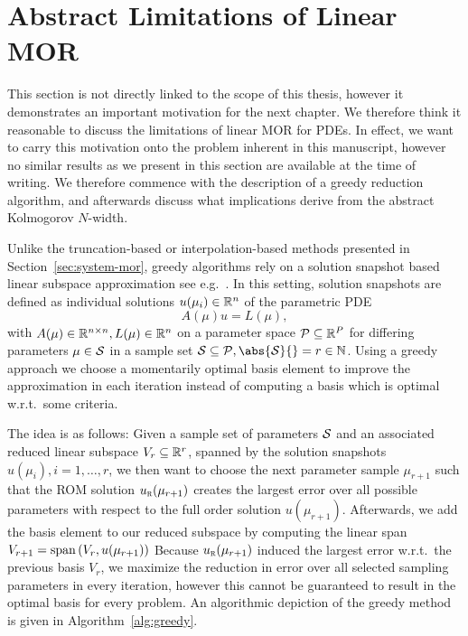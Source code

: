 \section{Abstract Limitations of Linear MOR}\label{sec:limitations-linear-mor}

This section is not directly linked to the scope of this thesis, however it demonstrates an important motivation for the next chapter.
We therefore think it reasonable to discuss the limitations of linear MOR for \acp{PDE}.
In effect, we want to carry this motivation onto the problem inherent in this manuscript, however no similar results as we present in this section are available at the time of writing.
We therefore commence with the description of a greedy reduction algorithm, and afterwards discuss what implications derive from the abstract Kolmogorov $N$-width.

Unlike the truncation-based or interpolation-based methods presented in Section~\ref{sec:system-mor}, greedy algorithms rely on a solution snapshot based linear subspace approximation see e.g.~\cite{Grepl2005, Rozza2008, Buffa2012}.
In this setting, solution snapshots are defined as individual solutions $u(\mu_i) \in \mathbb{R}^n$ of the parametric \ac{PDE}
\begin{equation}\label{eq:parametric-pde}
    A(\mu) u = L(\mu),
\end{equation}
with $A(\mu) \in \mathbb{R}^{n \times n}, L(\mu) \in \mathbb{R}^n$ on a parameter space $\mathcal{P} \subseteq \mathbb{R}^P$ for differing parameters $\mu \in \mathcal{S}$ in a sample set $\mcl{S} \subseteq \mcl{P}, \abs{\mcl{S}}{} = r \in \bb{N}$.
Using a greedy approach we choose a momentarily optimal basis element to improve the approximation in each iteration instead of computing a basis which is optimal w.r.t.\ some criteria.

The idea is as follows: Given a sample set of parameters $\mathcal{S}$ and an associated reduced linear subspace $V_r \subseteq \mathbb{R}^r$, spanned by the solution snapshots $u(\mu_i), i = 1, \dots, r$, we then want to choose the next parameter sample $\mu_{r + 1}$ such that the \ac{ROM} solution $u_{\textnormal{\scshape r}}(\mu_{r + 1})$ creates the largest error over all possible parameters with respect to the full order solution $u(\mu_{r + 1})$.
Afterwards, we add the basis element to our reduced subspace by computing the linear span $V_{r + 1} = \mathop{}\!\mathrm{span}\left(V_r, u(\mu_{r + 1})\right)$
Because $u_{\textnormal{\scshape r}}(\mu_{r + 1})$ induced the largest error w.r.t.\ the previous basis $V_r$, we maximize the reduction in error over all selected sampling parameters in every iteration, however this cannot be guaranteed to result in the optimal basis for every problem.
An algorithmic depiction of the greedy method is given in Algorithm~\ref{alg:greedy}.

